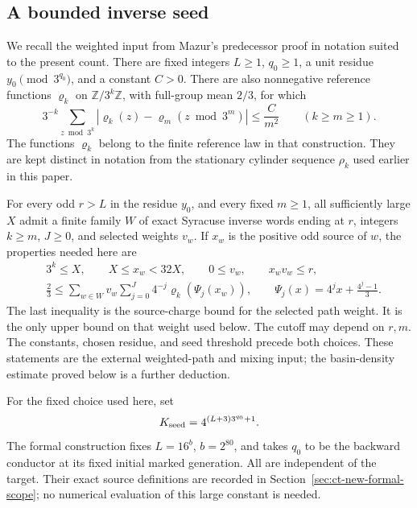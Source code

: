 \documentclass[11pt,a4paper]{article}
\begin{document}
\subsection{A bounded inverse seed}

We recall the weighted input from Mazur's predecessor proof
\cite[Proposition~3.1 and Appendix~A]{MazurPredecessors2026} in notation
suited to the present count. There are fixed integers \(L\ge1\),
\(q_0\ge1\), a unit residue \(y_0\pmod{3^{q_0}}\), and a constant
\(C>0\). There are also nonnegative reference functions
\(\varrho_k\) on \(\mathbb Z/3^k\mathbb Z\), with full-group mean
\(2/3\), for which
\begin{equation}\label{eq:ct-fan-mixing-input}
 3^{-k}\sum_{z\bmod3^k}
 \left|\varrho_k(z)-\varrho_m(z\bmod3^m)\right|
       \le\frac C{m^2}\qquad(k\ge m\ge1).
\end{equation}
The functions \(\varrho_k\) belong to the finite reference law in
that construction. They are kept distinct in notation from the
stationary cylinder sequence \(\rho_k\) used earlier in this paper.

For every odd \(r>L\) in the residue \(y_0\), and every fixed
\(m\ge1\), all sufficiently large \(X\) admit a finite family
\(W\) of exact Syracuse inverse words ending at \(r\), integers
\(k\ge m\), \(J\ge0\), and selected weights \(v_w\). If \(x_w\)
is the positive odd source of \(w\), the properties needed here are
\begin{align}
 &3^k\le X,\qquad X\le x_w<32X,\qquad
          0\le v_w,\qquad x_wv_w\le r,
          \label{eq:ct-weighted-source-window}\\
 &\frac23\le\sum_{w\in W}v_w
          \sum_{j=0}^{J}4^{-j}\varrho_k(\Psi_j(x_w)),
 \qquad
 \Psi_j(x)=4^jx+\frac{4^j-1}{3}.
 \label{eq:ct-weighted-source-input}
\end{align}
The last inequality is the source-charge bound for the selected
path weight. It is the only upper bound on that weight used below.
The cutoff may depend on \(r,m\). The constants, chosen residue,
and seed threshold precede both choices. These statements are the
external weighted-path and mixing input; the basin-density estimate
proved below is a further deduction.

For the fixed choice used here, set
\begin{equation}\label{eq:ct-seed-multiplier}
 K_{\rm seed}=4^{(L+3)3^{q_0}+1}.
\end{equation}
The formal construction fixes \(L=16^b\), \(b=2^{80}\), and takes
\(q_0\) to be the backward conductor at its fixed initial marked
generation. All are independent of the target. Their exact source
definitions are recorded in Section~\ref{sec:ct-new-formal-scope};
no numerical evaluation of this large constant is needed.
\end{document}
